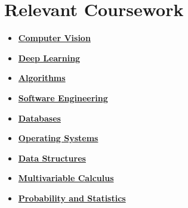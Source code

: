 \documentclass[letterpaper,11pt]{article}
\makeatletter
\let\oldhref\href
\renewcommand{\href}[2]{\oldhref{#1}{\bfseries#2}}
\newcommand{\resumeItem}[1]{
  \item\small{
    {#1 \vspace{-2pt}}
  }
}
\newcommand{\resumeSubheading}[4]{
  \vspace{-2pt}\item
    \begin{tabular*}{1.0\textwidth}[t]{l@{\extracolsep{\fill}}r}
      \textbf{#1} & \textbf{\small #2} \\
      \textit{\small#3} & \textit{\small #4} \\
    \end{tabular*}\vspace{-7pt}
}
\newcommand{\resumeSubHeadingListStart}{\begin{itemize}[leftmargin=0.0in, label={}]}
\newcommand{\resumeSubHeadingListEnd}{\end{itemize}}
\newcommand{\resumeItemListStart}{\begin{itemize}}
\newcommand{\resumeItemListEnd}{\end{itemize}\vspace{-5pt}}
\makeatother
\begin{document}
\section{Relevant Coursework}
        \begin{multicols}{4}
            \begin{itemize}[itemsep=0pt, parsep=2pt]
                \item\small \href{https://artsci.calendar.utoronto.ca/course/csc420h1}{Computer Vision}
                \item \href{https://artsci.calendar.utoronto.ca/course/csc413h1}{Deep Learning}
                \item \href{https://artsci.calendar.utoronto.ca/course/csc373h1}{Algorithms}
                \item \href{https://artsci.calendar.utoronto.ca/course/csc301h1}{Software Engineering}
                
                \item \href{https://artsci.calendar.utoronto.ca/course/csc343h1}{Databases}
                
                \item \href{https://artsci.calendar.utoronto.ca/course/csc369h1}{Operating Systems}
                \item \href{https://artsci.calendar.utoronto.ca/course/csc263h1}{Data Structures}
                \item \href{https://artsci.calendar.utoronto.ca/course/mat237h1}{Multivariable Calculus}
                \item \href{https://artsci.calendar.utoronto.ca/course/sta247h1}{Probability and Statistics}
            \end{itemize}
        \end{multicols}
        \vspace*{2.0\multicolsep}



    
\end{document}
